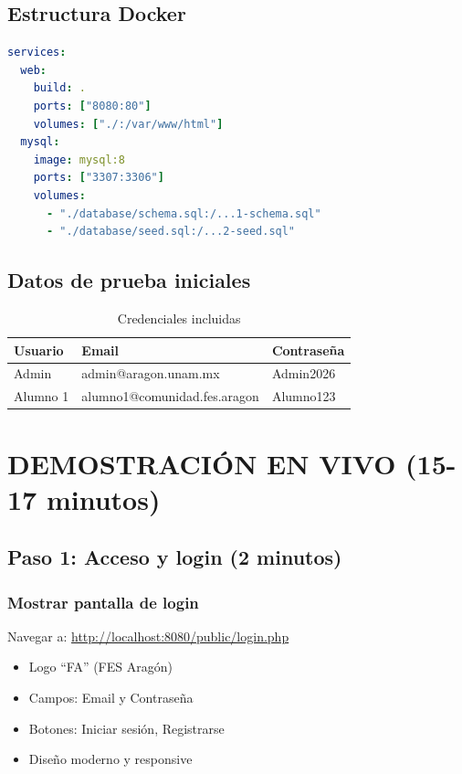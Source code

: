 \documentclass[12pt, a4paper, spanish]{article}
\begin{document}
\subsection{Estructura Docker}

\begin{lstlisting}[language=yaml, caption=docker-compose.yml]
services:
  web:
    build: .
    ports: ["8080:80"]
    volumes: ["./:/var/www/html"]
  mysql:
    image: mysql:8
    ports: ["3307:3306"]
    volumes:
      - "./database/schema.sql:/...1-schema.sql"
      - "./database/seed.sql:/...2-seed.sql"
\end{lstlisting}

\subsection{Datos de prueba iniciales}

\begin{table}[H]
\centering
\caption{Credenciales incluidas}
\small
\begin{tabular}{|l|l|l|}
\hline
\textbf{Usuario} & \textbf{Email} & \textbf{Contraseña} \\
\hline
Admin & admin@aragon.unam.mx & Admin2026 \\
Alumno 1 & alumno1@comunidad.fes.aragon & Alumno123 \\
\hline
\end{tabular}
\end{table}

\newpage

\section{DEMOSTRACIÓN EN VIVO (15-17 minutos)}

\subsection{Paso 1: Acceso y login (2 minutos)}

\subsubsection{Mostrar pantalla de login}

Navegar a: \url{http://localhost:8080/public/login.php}

\begin{itemize}
    \item Logo ``FA'' (FES Aragón)
    \item Campos: Email y Contraseña
    \item Botones: Iniciar sesión, Registrarse
    \item Diseño moderno y responsive
\end{itemize}
\end{document}
